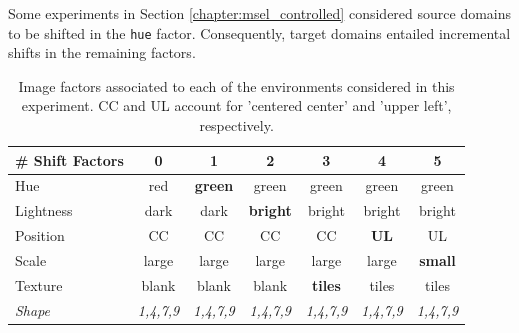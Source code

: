 \begin{dataset} Some experiments in Section \ref{chapter:msel_controlled}
    considered source domains to be shifted in the \texttt{hue} factor. Consequently, target
    domains entailed incremental shifts in the remaining factors.

    \begin{table}[H]
        \centering
        \begin{tabular}{l|c|c|c|c|c|c}
        \# Shift Factors  & 0 & 1 & 2 & 3 & 4 & 5 \\
        \midrule
        Hue & red & \textbf{green} & green & green & green & green \\
        Lightness & dark & dark & \textbf{bright} & bright & bright & bright \\
        Position  & CC & CC & CC & CC & \textbf{UL} & UL \\
        Scale  & large & large & large & large & large & \textbf{small} \\
        Texture & blank & blank & blank & \textbf{tiles} & tiles & tiles \\
        \textit{Shape} & \textit{1,4,7,9} &  \textit{1,4,7,9} &  \textit{1,4,7,9} & \textit{1,4,7,9} & \textit{1,4,7,9} & \textit{1,4,7,9} \\
        \bottomrule
        \end{tabular}
        \caption{
        Image factors associated to each of the environments considered in this experiment. CC and UL account
        for 'centered center' and 'upper left', respectively.
        }
    \end{table}
\end{dataset}

